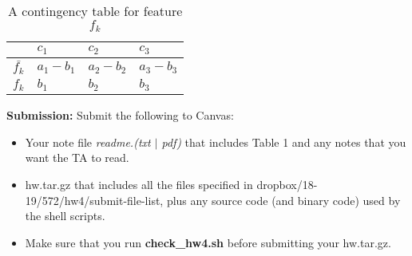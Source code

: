 \documentclass[11pt]{article}
\begin{document}
\begin{table}[bph]
\centering
\caption{A contingency table for feature $f_k$}
\label{table2}
\begin{tabular}{|l|l|l|l|} \hline
     &  $c_1$ & $c_2$  & $c_3$ \\ \hline
$\bar{f_k}$ & $a_1 - b_1$ & $a_2 - b_2$  & $a_3 - b_3$ \\ \hline
$f_k$ & $b_1$ & $b_2$  & $b_3$ \\ \hline

\end{tabular}
\label{table-Q1}
\end{table}





\vspace{0.5 in}
\noindent
{\bf Submission:}  Submit the following to Canvas:

\begin{itemize}
  \item Your note file {\it readme.(txt $\mid$ pdf)}
        that includes Table 1 and any notes that you want the TA to read.
      

  \item  hw.tar.gz that includes all the files specified in
      dropbox/18-19/572/hw4/submit-file-list, plus any source code
      (and binary code) used by the shell scripts.

  \item Make sure that you run {\bf check\_hw4.sh} before
       submitting your hw.tar.gz.
        
    
\end{itemize}
\end{document}

